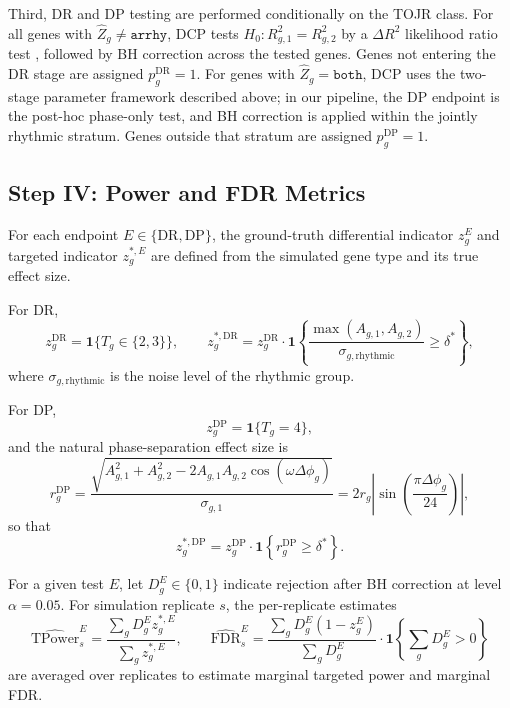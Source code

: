 \documentclass{article}
\begin{document}
Third, DR and DP testing are performed conditionally on the TOJR class. For
all genes with $\hat{Z}_g\neq\texttt{arrhy}$, DCP tests
$H_0:R^2_{g,1}=R^2_{g,2}$ by a $\Delta R^2$ likelihood ratio test
\cite{ding2021likelihood}, followed by BH correction across the tested genes.
Genes not entering the DR stage are assigned $p_g^{\mathrm{DR}}=1$.
For genes with $\hat{Z}_g=\texttt{both}$, DCP uses the two-stage parameter
framework described above; in our pipeline, the DP endpoint is the post-hoc
phase-only test, and BH correction is applied within the jointly rhythmic
stratum. Genes outside that stratum are assigned $p_g^{\mathrm{DP}}=1$.

\subsection{Step IV: Power and FDR Metrics}
\label{sec:metrics}

For each endpoint $E\in\{\mathrm{DR},\mathrm{DP}\}$, the ground-truth
differential indicator $z_g^E$ and targeted indicator $z_g^{*,E}$ are defined
from the simulated gene type and its true effect size.

For DR,
\begin{equation}
z_g^{\mathrm{DR}} = \mathbf{1}\{T_g\in\{2,3\}\},
\qquad
z_g^{*,\mathrm{DR}}
=
z_g^{\mathrm{DR}}
\cdot
\mathbf{1}\!\left\{
\frac{\max(A_{g,1},A_{g,2})}{\sigma_{g,\mathrm{rhythmic}}}\geq\delta^*
\right\},
\label{eq:dr_target}
\end{equation}
where $\sigma_{g,\mathrm{rhythmic}}$ is the noise level of the rhythmic group.

For DP,
\begin{equation}
z_g^{\mathrm{DP}} = \mathbf{1}\{T_g=4\},
\end{equation}
and the natural phase-separation effect size is
\begin{equation}
r_g^{\mathrm{DP}}
=
\frac{\sqrt{A_{g,1}^2+A_{g,2}^2-2A_{g,1}A_{g,2}\cos(\omega\Delta\phi_g)}}{\sigma_{g,1}}
=
2r_g\left|\sin\!\left(\frac{\pi\Delta\phi_g}{24}\right)\right|,
\label{eq:dp_snr}
\end{equation}
so that
\begin{equation}
z_g^{*,\mathrm{DP}}
=
z_g^{\mathrm{DP}}\cdot
\mathbf{1}\!\left\{r_g^{\mathrm{DP}}\geq\delta^*\right\}.
\label{eq:dp_target}
\end{equation}

For a given test $E$, let $D_g^E\in\{0,1\}$ indicate rejection after BH
correction at level $\alpha=0.05$. For simulation replicate $s$, the
per-replicate estimates
\[
\widehat{\mathrm{TPower}}_s^{E}
=
\frac{\sum_g D_g^{E} z_g^{*,E}}{\sum_g z_g^{*,E}},
\qquad
\widehat{\mathrm{FDR}}_s^{E}
=
\frac{\sum_g D_g^{E}(1-z_g^{E})}{\sum_g D_g^{E}}
\cdot\mathbf{1}\!\left\{\sum_g D_g^{E}>0\right\}
\]
are averaged over replicates to estimate marginal targeted power and marginal
FDR.
\end{document}
